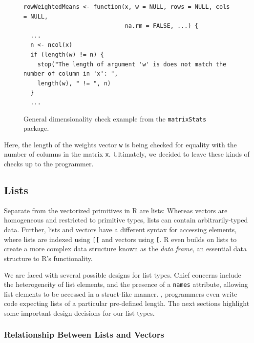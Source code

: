 \documentclass[acmsmall,review,anonymous]{acmart}\settopmatter{printfolios=true,printccs=false,printacmref=false}
\newcommand{\code}[1]{{\lstinline[style=Rin]!#1!}\xspace}
\begin{document}
\begin{figure}[htbp]
\begin{center}

\begin{lstlisting}
rowWeightedMeans <- function(x, w = NULL, rows = NULL, cols = NULL,
                             na.rm = FALSE, ...) {
  ...
  n <- ncol(x)
  if (length(w) != n) {
    stop("The length of argument 'w' is does not match the number of column in 'x': ", 
    length(w), " != ", n)
  }
  ...
\end{lstlisting}

\caption{General dimensionality check example from the \code{matrixStats} package.}
\label{fig:general-validation-example}
\end{center}
\end{figure}

Here, the length of the weights vector \code{w} is being checked for equality with the number of columns in the matrix \code{x}. 
Ultimately, we decided to leave these kinds of checks up to the programmer.

%
%
%
%
\subsection{Lists}

Separate from the vectorized primitives in R are lists:
Whereas vectors are homogeneous and restricted to primitive types, lists can contain arbitrarily-typed data.  
Further, lists and vectors have a different syntax for accessing elements, where lists are indexed using \code{[[} and vectors using \code{[}.
R even builds on lists to create a more complex data structure known as the {\it data frame}, an essential data structure to R's functionality.

We are faced with several possible designs for list types.  
Chief concerns include the heterogeneity of list elements, and the presence of a \code{names} attribute, allowing list elements to be accessed in a struct-like manner.  
, programmers even write code expecting lists of a particular pre-defined length.  
The next sections highlight some important design decisions for our list types.

%
%
\subsubsection{Relationship Between Lists and Vectors}
\end{document}
